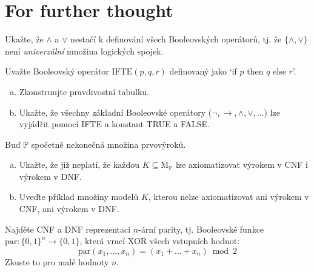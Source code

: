 \section*{For further thought}


\begin{problem}
    
    Ukažte, že $\wedge$ a $\vee$ nestačí k definování všech Booleovských operátorů, tj. že $\{\wedge,\vee\}$ není \emph{univerzální} množina logických spojek.

\end{problem}


\begin{problem}
    
    Uvažte Booleovský operátor $\mathrm{IFTE}(p, q, r)$ definovaný jako `if $p$ then $q$ else $r$'. 
    \begin{enumerate}[(a)]
        \item Zkonstruujte pravdivostní tabulku.
        \item Ukažte, že všechny základní Booleovské operátory ($\neg, \to, \wedge,\vee,\dots$) lze vyjádřit pomocí IFTE a konstant TRUE a FALSE.
    \end{enumerate}

\end{problem}


\begin{problem} 
    
    Buď $\mathbb P$ spočetně nekonečná množina prvovýroků.    
    \begin{enumerate}[(a)]
        \item Ukažte, že již neplatí, že každou $K\subseteq \mathrm{M}_\mathbb P$ lze axiomatizovat výrokem v CNF i výrokem v DNF.
        \item  Uveďte příklad množiny modelů $K$, kterou nelze axiomatizovat ani výrokem v CNF, ani výrokem v DNF.
    \end{enumerate}

\end{problem}


\begin{problem} 
    
    Najděte CNF a DNF reprezentaci $n$-ární parity, tj. Booleovské funkce $\mathrm{par}\colon\{0,1\}^n\to \{0,1\}$,
    která vrací XOR všech vstupních hodnot:
    $$
    \mathrm{par}(x_1,\dots,x_n)=(x_1+\dots+x_n)\bmod 2
    $$
    Zkuste to pro malé hodnoty $n$.

\end{problem}


